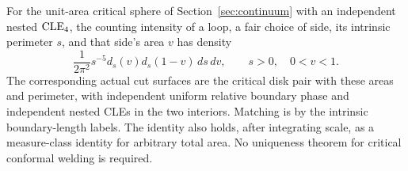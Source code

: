 \begin{proposition}\label{cut:palm}
For the unit-area critical sphere of Section~\ref{sec:continuum} with an
independent nested \(\mathrm{CLE}_4\), the counting intensity of a loop, a fair choice
of side, its intrinsic perimeter \(s\), and that side's area
\(v\) has density
\[
 \frac1{2\pi^2}s^{-5}d_s(v)d_s(1-v)\,ds\,dv,
 \qquad s>0,\quad 0<v<1.
\]
The corresponding actual cut surfaces are the critical disk pair with these
areas and perimeter, with independent uniform relative boundary phase and
independent nested CLEs in the two interiors.  Matching is by the intrinsic
boundary-length labels.  The identity also holds, after integrating scale,
as a measure-class identity for arbitrary total area.  No uniqueness theorem
for critical conformal welding is required.
\end{proposition}
